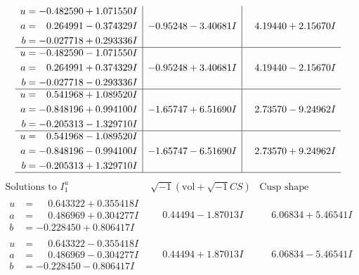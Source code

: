 \documentclass[1p]{elsarticle_modified}
\theoremstyle{definition}
\newcommand{\I}{\sqrt{-1}}
\begin{document}
$$\begin{array}{c|c|c}
\begin{aligned}
u &= -0.482590 + 1.071550 I \\
a &= \phantom{-}0.264991 - 0.374329 I \\
b &= -0.027718 + 0.293336 I\end{aligned}
 & -0.95248 - 3.40681 I & \phantom{-}4.19440 + 2.15670 I \\ \hline\begin{aligned}
u &= -0.482590 - 1.071550 I \\
a &= \phantom{-}0.264991 + 0.374329 I \\
b &= -0.027718 - 0.293336 I\end{aligned}
 & -0.95248 + 3.40681 I & \phantom{-}4.19440 - 2.15670 I \\ \hline\begin{aligned}
u &= \phantom{-}0.541968 + 1.089520 I \\
a &= -0.848196 + 0.994100 I \\
b &= -0.205313 - 1.329710 I\end{aligned}
 & -1.65747 + 6.51690 I & \phantom{-}2.73570 - 9.24962 I \\ \hline\begin{aligned}
u &= \phantom{-}0.541968 - 1.089520 I \\
a &= -0.848196 - 0.994100 I \\
b &= -0.205313 + 1.329710 I\end{aligned}
 & -1.65747 - 6.51690 I & \phantom{-}2.73570 + 9.24962 I\\
 \hline 
 \end{array}$$\newpage$$\begin{array}{c|c|c}  
\text{Solutions to }I^u_{1}& \I (\text{vol} + \sqrt{-1}CS) & \text{Cusp shape}\\
 \hline 
\begin{aligned}
u &= \phantom{-}0.643322 + 0.355418 I \\
a &= \phantom{-}0.486969 + 0.304277 I \\
b &= -0.228450 + 0.806417 I\end{aligned}
 & \phantom{-}0.44494 - 1.87013 I & \phantom{-}6.06834 + 5.46541 I \\ \hline\begin{aligned}
u &= \phantom{-}0.643322 - 0.355418 I \\
a &= \phantom{-}0.486969 - 0.304277 I \\
b &= -0.228450 - 0.806417 I\end{aligned}
 & \phantom{-}0.44494 + 1.87013 I & \phantom{-}6.06834 - 5.46541 I \\ \hline\begin{aligned}

\end{aligned}
\end{array}$$
\end{document}
